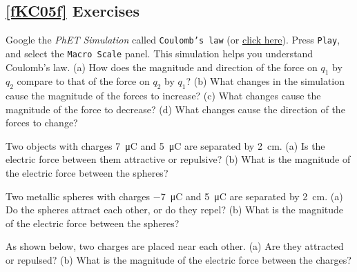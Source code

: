 \documentclass[dvipsnames]{article}
\numberwithin{equation}{section}
\numberwithin{figure}{section}
\begin{document}
\cyanhrule

\subsection*{\ref{fKC05f} Exercises}

\begin{exercise}
    Google the \textit{PhET Simulation} called \texttt{Coulomb's law} (or \href{https://phet.colorado.edu/en/simulations/coulombs-law}{click here}). Press \texttt{Play}, and select the \texttt{Macro Scale} panel. This simulation helps you understand Coulomb's law. (a) How does the magnitude and direction of the force on $q_1$ by $q_2$ compare to that of the force on $q_2$ by $q_1$? (b) What changes in the simulation cause the magnitude of the forces to increase? (c) What changes cause the magnitude of the force to decrease? (d) What changes cause the direction of the forces to change?
\end{exercise}

\begin{exercise} \label{z4pMlx}
Two objects with charges \SI{7}{\micro C} and \SI{5}{\micro C} are separated by \SI{2}{cm}. (a) Is the electric force between them attractive or repulsive? (b) What is the magnitude of the electric force between the spheres?
\end{exercise}

\begin{exercise} \label{TPIAio}
    Two metallic spheres with charges \SI{-7}{\micro C} and \SI{5}{\micro C} are separated by \SI{2}{cm}. (a) Do the spheres attract each other, or do they repel? (b) What is the magnitude of the electric force between the spheres?
\end{exercise}

\begin{exercise} \label{mJu5SD}
    As shown below, two charges are placed near each other. (a) Are they attracted or repulsed? (b) What is the magnitude of the electric force between the charges?
    \vspace{-1em}
    
\begin{center}
\end{center}
\end{exercise}
\end{document}
